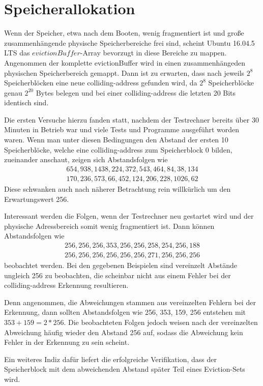 \section{Speicherallokation}

Wenn der Speicher, etwa nach dem Booten, wenig fragmentiert ist und große zusammenhängende physische Speicherbereiche frei sind, scheint Ubuntu 16.04.5 LTS das $evictionBuffer$-Array bevorzugt in diese Bereiche zu mappen.
Angenommen der komplette evictionBuffer wird in einen zusammenhängeden physischen Speicherbereich gemappt. Dann ist zu erwarten, dass nach jeweils $2^8$ Speicherblöcken eine neue colliding-address gefunden wird, da $2^8$ Speicherblöcke genau $2^{20}$ Bytes belegen und bei einer colliding-address die letzten 20 Bits identisch sind.

Die ersten Versuche hierzu fanden statt, nachdem der Testrechner bereits über 30 Minuten in Betrieb war und viele Tests und Programme ausgeführt worden waren.
Wenn man unter diesen Bedingungen den Abstand der ersten 10 Speicherblöcke, welche eine colliding-address zum Speicherblock 0 bilden, zueinander anschaut, zeigen sich Abstandsfolgen wie 
\begin{align*} 
654, 938, 1438, 224, 372, 543, 464, 84, 38, 134\\
170, 236, 573, 66, 452, 124, 206, 228, 1026, 62
\end{align*}
Diese schwanken auch nach näherer Betrachtung rein willkürlich um den Erwartungswert 256.

Interessant werden die Folgen, wenn der Testrechner neu gestartet wird und der physische Adressbereich somit wenig fragmentiert ist.
Dann können Abstandsfolgen wie 
\begin{align*} 
256, 256, 256, 353, 256, 256, 258, 254, 256, 188\\
256, 256, 256, 256, 256, 256, 271, 256, 256, 256
\end{align*}
beobachtet werden.
Bei den gegebenen Beispielen sind vereinzelt Abstände ungleich 256 zu beobachten, die scheinbar nicht aus einem Fehler bei der colliding-address Erkennung resultieren.

Denn angenommen, die Abweichungen stammen aus vereinzelten Fehlern bei der Erkennung, dann sollten Abstandsfolgen wie 256, 353, 159, 256 entstehen mit $353+159=2*256$.
Die beobachteten Folgen jedoch weisen nach der vereinzelten Abweichung häufig wieder den Abstand 256 auf, sodass die Abweichung kein Fehler in der Erkennung zu sein scheint.

Ein weiteres Indiz dafür liefert die erfolgreiche Verifikation, dass der Speicherblock mit dem abweichenden Abstand später Teil eines Eviction-Sets wird.

